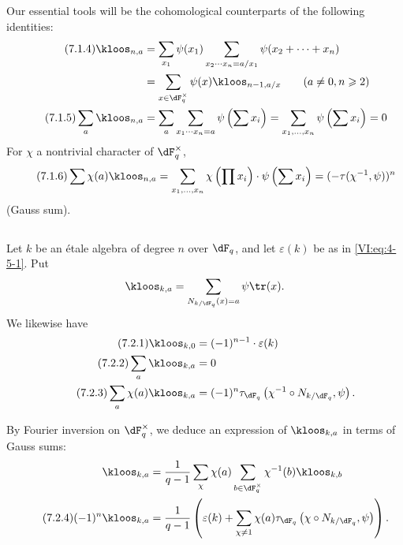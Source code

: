 \documentclass[oneside]{book}
\begin{document}
Our essential tools will be the cohomological counterparts of the 
following identities: 
\begin{align*}\tag{7.1.4}\label{VI:eq:7-1-4}
  \kloos_{n,a} &= \sum_{x_1} \psi(x_1) \sum_{x_2\dotsm x_n = a/x_1} \psi(x_2+\cdots + x_n) \\ \notag
    &= \sum_{x\in \dF_q^\times} \psi(x) \kloos_{n-1,a/x} \qquad (a\ne 0,n\geqslant 2) \\ \tag{7.1.5}\label{VI:eq:7-1-5}
  \sum_a \kloos_{n,a} &= \sum_a \sum_{x_1 \dotsm x_n = a} \psi\left(\sum x_i\right) = \sum_{x_1,\dots,x_n} \psi\left(\sum x_i\right) = 0 
\end{align*}
For $\chi$ a nontrivial character of $\dF_q^\times$, 
\begin{equation*}\tag{7.1.6}\label{VI:eq:7-1-6}
  \sum \chi(a) \kloos_{n,a} = \sum_{x_1,\dots,x_n} \chi\left(\prod x_i\right) \cdot \psi\left(\sum x_i\right) = (-\tau(\chi^{-1},\psi))^n 
\end{equation*}
(Gauss sum). 





\subsection{}\label{VI:7-2}

Let $k$ be an étale algebra of degree $n$ over $\dF_q$, and let $\varepsilon(k)$ 
be as in \eqref{VI:eq:4-5-1}. Put 
\[
  \kloos_{k,a} = \sum_{N_{k/\dF_q}(x)=a} \psi \tr(x) \text{.} 
\]
We likewise have 
\begin{align*}\tag{7.2.1}\label{VI:eq:7-2-1}
  \kloos_{k,0} &= (-1)^{n-1} \cdot \varepsilon(k) \\ \tag{7.2.2}\label{VI:eq:7-2-2}
  \sum_a \kloos_{k,a} &= 0 \\ \tag{7.2.3}\label{VI:eq:7-2-3}
  \sum_a \chi(a) \kloos_{k,a} &= (-1)^n \tau_{\dF_q}\left(\chi^{-1}\circ N_{k/\dF_q},\psi\right) \text{.} 
\end{align*}

By Fourier inversion on $\dF_q^\times$, we deduce an expression of 
$\kloos_{k,a}$ in terms of Gauss sums: 
\begin{align*} 
  \kloos_{k,a} &= \frac{1}{q-1} \sum_\chi \chi(a) \sum_{b\in \dF_q^\times} \chi^{-1}(b) \kloos_{k,b} \\ \tag{7.2.4}\label{VI:eq:7-2-4}
  (-1)^n \kloos_{k,a} &= \frac{1}{q-1} \left(\varepsilon(k) + \sum_{\chi\ne 1} \chi(a) \tau_{\dF_q}\left(\chi\circ N_{k/\dF_q},\psi\right) \right) \text{.} 
\end{align*}
\end{document}
